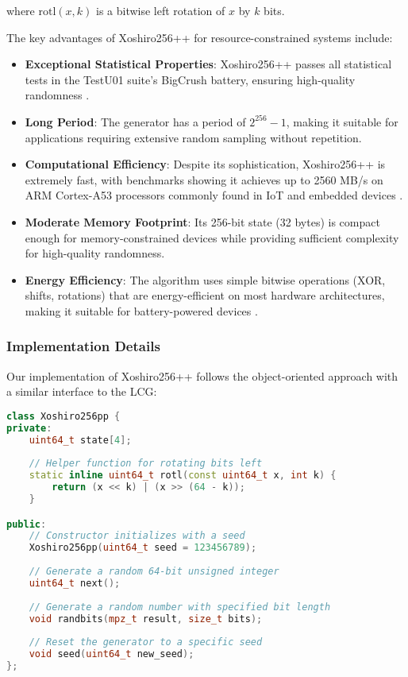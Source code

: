 where $\text{rotl}(x, k)$ is a bitwise left rotation of $x$ by $k$ bits.

The key advantages of Xoshiro256++ for resource-constrained systems include:

\begin{itemize}
    \item \textbf{Exceptional Statistical Properties}: Xoshiro256++ passes all statistical tests in the TestU01 suite's BigCrush battery, ensuring high-quality randomness \cite{blackman2019, xoshiro_website}.
    
    \item \textbf{Long Period}: The generator has a period of $2^{256} - 1$, making it suitable for applications requiring extensive random sampling without repetition.
    
    \item \textbf{Computational Efficiency}: Despite its sophistication, Xoshiro256++ is extremely fast, with benchmarks showing it achieves up to 2560 MB/s on ARM Cortex-A53 processors commonly found in IoT and embedded devices \cite{xoshiro_website}.
    
    \item \textbf{Moderate Memory Footprint}: Its 256-bit state (32 bytes) is compact enough for memory-constrained devices while providing sufficient complexity for high-quality randomness.
    
    \item \textbf{Energy Efficiency}: The algorithm uses simple bitwise operations (XOR, shifts, rotations) that are energy-efficient on most hardware architectures, making it suitable for battery-powered devices \cite{prng_iot}.
\end{itemize}

\subsubsection{Implementation Details}

Our implementation of Xoshiro256++ follows the object-oriented approach with a similar interface to the LCG:

\begin{lstlisting}[language=C++, caption=Xoshiro256++ Implementation (Header)]
class Xoshiro256pp {
private:
    uint64_t state[4];
    
    // Helper function for rotating bits left
    static inline uint64_t rotl(const uint64_t x, int k) {
        return (x << k) | (x >> (64 - k));
    }

public:
    // Constructor initializes with a seed
    Xoshiro256pp(uint64_t seed = 123456789);
    
    // Generate a random 64-bit unsigned integer
    uint64_t next();
    
    // Generate a random number with specified bit length
    void randbits(mpz_t result, size_t bits);
    
    // Reset the generator to a specific seed
    void seed(uint64_t new_seed);
};
\end{lstlisting}


